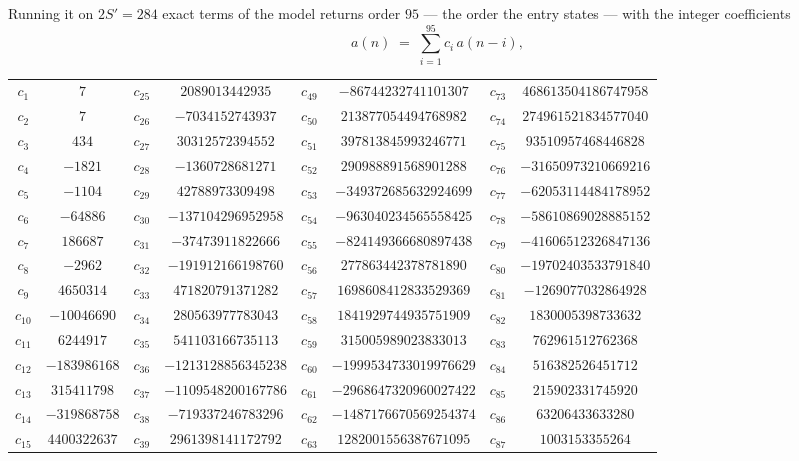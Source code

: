 \documentclass[11pt,a4paper]{article}
\theoremstyle{plain}
\theoremstyle{definition}
\begin{document}
Running it on $2S'=284$ exact terms of the model returns order $95$ --- the order the
entry states --- with the integer coefficients
\[
a(n)\;=\;\sum_{i=1}^{95}c_i\,a(n-i),
\]
\begin{center}\small
\begin{tabular}{cccccccc}
$c_{1}$ & $7$ & $c_{25}$ & $2089013442935$ & $c_{49}$ & $-86744232741101307$ & $c_{73}$ & $468613504186747958$ \\
$c_{2}$ & $7$ & $c_{26}$ & $-7034152743937$ & $c_{50}$ & $213877054494768982$ & $c_{74}$ & $274961521834577040$ \\
$c_{3}$ & $434$ & $c_{27}$ & $30312572394552$ & $c_{51}$ & $397813845993246771$ & $c_{75}$ & $93510957468446828$ \\
$c_{4}$ & $-1821$ & $c_{28}$ & $-1360728681271$ & $c_{52}$ & $290988891568901288$ & $c_{76}$ & $-31650973210669216$ \\
$c_{5}$ & $-1104$ & $c_{29}$ & $42788973309498$ & $c_{53}$ & $-349372685632924699$ & $c_{77}$ & $-62053114484178952$ \\
$c_{6}$ & $-64886$ & $c_{30}$ & $-137104296952958$ & $c_{54}$ & $-963040234565558425$ & $c_{78}$ & $-58610869028885152$ \\
$c_{7}$ & $186687$ & $c_{31}$ & $-37473911822666$ & $c_{55}$ & $-824149366680897438$ & $c_{79}$ & $-41606512326847136$ \\
$c_{8}$ & $-2962$ & $c_{32}$ & $-191912166198760$ & $c_{56}$ & $277863442378781890$ & $c_{80}$ & $-19702403533791840$ \\
$c_{9}$ & $4650314$ & $c_{33}$ & $471820791371282$ & $c_{57}$ & $1698608412833529369$ & $c_{81}$ & $-1269077032864928$ \\
$c_{10}$ & $-10046690$ & $c_{34}$ & $280563977783043$ & $c_{58}$ & $1841929744935751909$ & $c_{82}$ & $1830005398733632$ \\
$c_{11}$ & $6244917$ & $c_{35}$ & $541103166735113$ & $c_{59}$ & $315005989023833013$ & $c_{83}$ & $762961512762368$ \\
$c_{12}$ & $-183986168$ & $c_{36}$ & $-1213128856345238$ & $c_{60}$ & $-1999534733019976629$ & $c_{84}$ & $516382526451712$ \\
$c_{13}$ & $315411798$ & $c_{37}$ & $-1109548200167786$ & $c_{61}$ & $-2968647320960027422$ & $c_{85}$ & $215902331745920$ \\
$c_{14}$ & $-319868758$ & $c_{38}$ & $-719337246783296$ & $c_{62}$ & $-1487176670569254374$ & $c_{86}$ & $63206433633280$ \\
$c_{15}$ & $4400322637$ & $c_{39}$ & $2961398141172792$ & $c_{63}$ & $1282001556387671095$ & $c_{87}$ & $1003153355264$ \\

\end{tabular}
\end{center}
\end{document}
